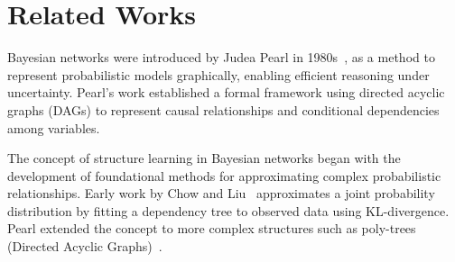 \section{Related Works}

Bayesian networks were introduced by Judea Pearl in 1980s~\cite{pearl1985bayesian, pearl1988probabilistic}, as a method to represent probabilistic models graphically, enabling efficient reasoning under uncertainty. Pearl's work established a formal framework using directed acyclic graphs (DAGs) to represent causal relationships and conditional dependencies among variables.

The concept of structure learning in Bayesian networks began with the development of foundational methods for approximating complex probabilistic relationships. Early work by Chow and Liu~\cite{chowliu1968} approximates a joint probability distribution by fitting a dependency tree to observed data using KL-divergence. Pearl extended the concept to more complex structures such as poly-trees (Directed Acyclic Graphs)~\cite{pearl1989recovery}.


